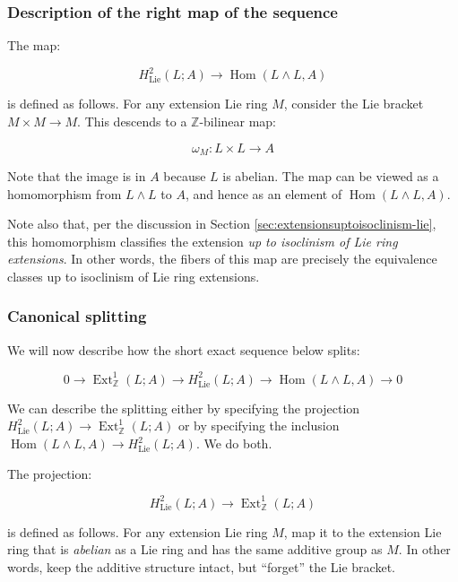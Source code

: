 \subsubsection{Description of the right map of the sequence}\label{sec:ses-uct-lie-abelian-right-map}

The map:

$$H^2_{\text{Lie}}(L;A) \to \operatorname{Hom}(L \wedge L,A)$$

is defined as follows. For any extension Lie ring $M$, consider the
Lie bracket $M \times M \to M$. This descends to a
$\mathbb{Z}$-bilinear map:

$$\omega_M: L \times L \to A$$

Note that the image is in $A$ because $L$ is abelian. The map can be
viewed as a homomorphism from $L \wedge L$ to $A$, and hence as an
element of $\operatorname{Hom}(L \wedge L,A)$.

Note also that, per the discussion in Section
\ref{sec:extensionsuptoisoclinism-lie}, this homomorphism classifies
the extension {\em up to isoclinism of Lie ring extensions}. In other
words, the fibers of this map are precisely the equivalence classes up
to isoclinism of Lie ring extensions.
\subsubsection{Canonical splitting}\label{sec:ses-uct-lie-abelian-canonical-splitting}

We will now describe how the short exact sequence below splits:

\begin{equation*}
0 \to \operatorname{Ext}^1_{\mathbb{Z}}(L;A) \to H^2_{\text{Lie}}(L;A) \to \operatorname{Hom}(L \wedge L, A) \to 0
\end{equation*}

We can describe the splitting either by specifying the projection
$H^2_{\text{Lie}}(L;A) \to \operatorname{Ext}^1_{\mathbb{Z}}(L;A)$ or by specifying
the inclusion $\operatorname{Hom}(L \wedge L,A) \to H^2_{\text{Lie}}(L;A)$. We do both.

The projection:

$$H^2_{\text{Lie}}(L;A) \to \operatorname{Ext}^1_{\mathbb{Z}}(L;A)$$

is defined as follows. For any extension Lie ring $M$, map it to the
extension Lie ring that is {\em abelian} as a Lie ring and has the
same additive group as $M$. In other words, keep the additive
structure intact, but ``forget'' the Lie bracket.

